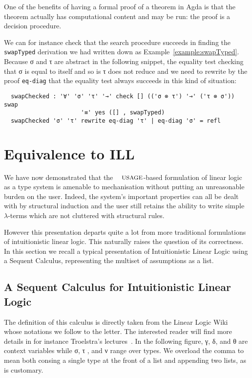 One of the benefits of having a formal proof of a theorem in Agda is that
the theorem actually has computational content and may be run: the proof
is a decision procedure.

\begin{example}We can for instance check that the search procedure
succeeds in finding the \texttt{swapTyped} derivation we had written down
as Example~\ref{example:swapTyped}. Because σ and τ are abstract in the
following snippet, the equality test checking that σ is equal to itself
and so is τ does not reduce and we need to rewrite by the proof
\texttt{eq-diag} that the equality test always succeeds in this kind of
situation:
\begin{lstlisting}
  swapChecked : '∀' 'σ' 'τ' '→' check [] (('σ ⊗ τ') '⊸' ('τ ⊗ σ')) swap
                      '≡' yes ([] , swapTyped)
  swapChecked 'σ' 'τ' rewrite eq-diag 'τ' | eq-diag 'σ' = refl
\end{lstlisting}
\end{example}



\section{Equivalence to ILL}\label{sec:equivalence}

We have now demonstrated that the $\Usages{}$-based formulation of
linear logic as a type system is amenable to mechanisation without
putting an unreasonable burden on the user. Indeed, the system's
important properties can all be dealt with by structural induction
and the user still retains the ability to write simple $λ$-terms
which are not cluttered with structural rules.

However this presentation departs quite a lot from more traditional
formulations of intuitionistic linear logic. This naturally raises
the question of its correctness. In this section we recall a typical
presentation of Intuitionistic Linear Logic using a Sequent Calculus,
representing the multiset of assumptions as a list.

\subsection{A Sequent Calculus for Intuitionistic Linear Logic}

The definition of this calculus is directly taken from the Linear Logic
Wiki~\cite{wiki:linearlogic} whose notations we follow to the letter.
The interested reader will find more details in for instance Troelstra's
lectures~\cite{troelstra1991lectures}. In the following figure, γ, δ,
and θ are context variables while σ, τ , and ν range over types. We
overload the comma to mean both consing a single type at the front
of a list and appending two lists, as is customary.

